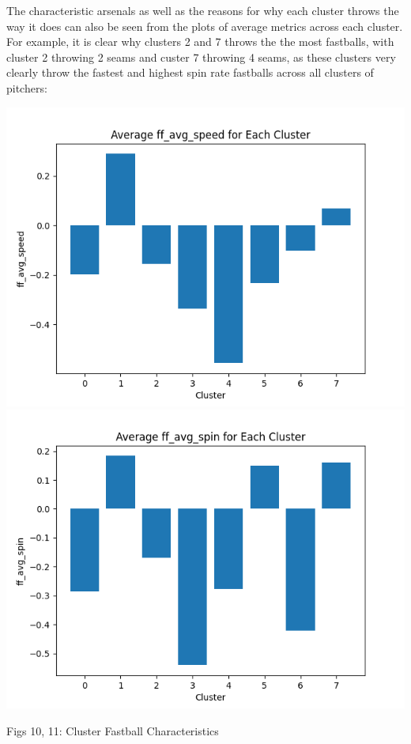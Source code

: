 \documentclass[12 pt]{article}
\begin{document}
\indent The characteristic arsenals as well as the reasons for why each cluster throws the way it does can also be seen from 
the plots of average metrics across each cluster. For example, it is clear why clusters 
2 and 7 throws the the most fastballs, with cluster 2 throwing 2 seams and custer 7 throwing 
4 seams, as these clusters very clearly throw the fastest and highest spin rate fastballs 
across all clusters of pitchers:

\includegraphics[scale = .5]{figs/cls_ff_vel.png}
\includegraphics[scale = .5]{figs/cls_ff_spin.png}
\begin{center}Figs 10, 11: Cluster Fastball Characteristics\end{center}
\end{document}
